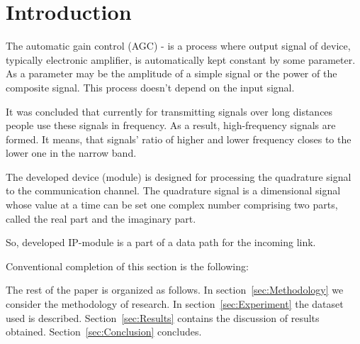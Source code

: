 \section{Introduction}
\label{sec:Intro}


	The automatic gain control (AGC) - is a process where output signal of device, typically electronic amplifier, is automatically kept constant by some parameter. As a parameter may be the amplitude of a simple signal or the power of the composite signal. This process doesn't depend on the input signal.

	It was concluded that currently for transmitting signals over long distances people use these signals in frequency. As a result, high-frequency signals are formed. It means, that signals' ratio of higher and lower frequency closes to the lower one in the narrow band.
	
	The developed device (module) is designed for processing the quadrature signal to the communication channel. The quadrature signal is a dimensional signal whose value at a time can be set one complex number comprising two parts, called the real part and the imaginary part. 
	
	So, developed IP-module is a part of a data path for the incoming link.

	Conventional completion of this section is the following:

	The rest of the paper is organized as follows. In section~\ref{sec:Methodology} we consider the methodology of research. In section~\ref{sec:Experiment} the dataset used is described. Section~\ref{sec:Results} contains the discussion of results obtained. Section~\ref{sec:Conclusion} concludes.
